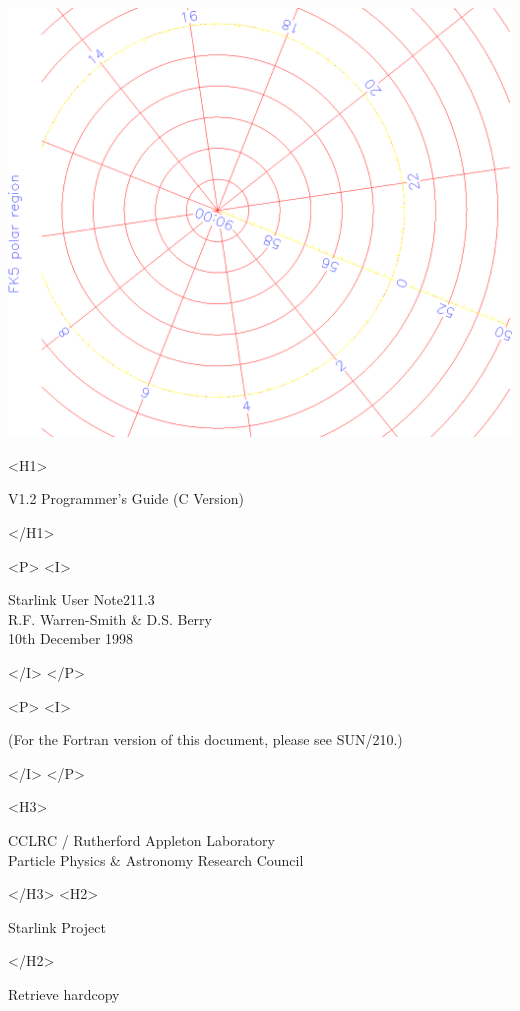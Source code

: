 \documentclass[twoside,11pt]{article}
\newcommand{\stardoccategory}  {Starlink User Note}
\newcommand{\stardocsource}    {sun\stardocnumber}
\newcommand{\stardocnumber}    {211.3}
\newcommand{\stardocauthors}   {R.F. Warren-Smith \& D.S. Berry}
\newcommand{\stardocdate}      {10th December 1998}
\newcommand{\stardocversion}   {V1.2}
\newcommand{\stardocmanualhtml}{Programmer's Guide (C Version)}
\newcommand{\htmladdnormallink}[2]{#1}
\newcommand{\htmladdimg}[1]{}
\newcommand{\xref}[3]{#1}
\begin{document}
\begin{htmlonly}
   \includegraphics[scale=0.3,angle=-90]{sun211_figures/frontc.eps}

   \begin{rawhtml} <H1> \end{rawhtml}
      \stardocversion
      \stardocmanualhtml
   \begin{rawhtml} </H1> \end{rawhtml}
   \begin{rawhtml} <P> <I> \end{rawhtml}
   \stardoccategory \stardocnumber \\
   \stardocauthors \\
   \stardocdate
   \begin{rawhtml} </I> </P> \end{rawhtml}
   \begin{rawhtml} <P> <I> \end{rawhtml}
   (For the Fortran version of this document, please see
    \xref{SUN/210}{sun210}{}.)
   \begin{rawhtml} </I> </P> \end{rawhtml}
   \begin{rawhtml} <H3> \end{rawhtml}
      \htmladdnormallink{CCLRC}{http://www.cclrc.ac.uk} /
      \htmladdnormallink{Rutherford Appleton Laboratory}
                        {http://www.cclrc.ac.uk/ral} \\
      \htmladdnormallink{Particle Physics \& Astronomy Research Council}
                        {http://www.pparc.ac.uk} \\
   \begin{rawhtml} </H3> <H2> \end{rawhtml}
      \htmladdnormallink{Starlink Project}{http://star-www.rl.ac.uk/}
   \begin{rawhtml} </H2> \end{rawhtml}
   \htmladdnormallink{\htmladdimg{source.gif} Retrieve hardcopy}
      {http://star-www.rl.ac.uk/cgi-bin/hcserver?\stardocsource}\\


\end{htmlonly}
\end{document}
